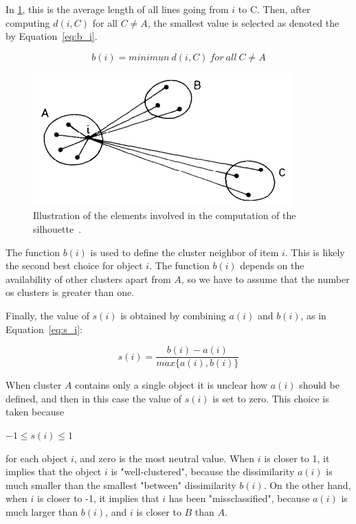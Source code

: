 \documentclass[journal]{IEEEtran}
\begin{document}
	In \ref{fig:silhouette}, this is the average length of all lines going from $i$ to C. Then, after computing $d(i, C)$ for all $C \neq A$, the smallest value is selected as denoted the by Equation~\ref{eq:b_i}.
	
	\begin{equation} \label{eq:b_i}
	b(i) = minimun~d(i, C)~for~all~C \neq A
	\end{equation}
	
	\begin{figure}[!htb]
		\centering
		\includegraphics[scale=.6]{figures/silhouette_img.png}
		\caption{Illustration of the elements involved in the computation of the silhouette~\cite{rousseeuw1987silhouettes}.}
		\label{fig:silhouette}
	\end{figure}
	
	The function $b(i)$ is used to define the cluster neighbor of item $i$. This is likely the second best choice for object $i$. The function $b(i)$ depends on the availability of other clusters apart from $A$, so we have to assume that the number os clusters is greater than one.
	
	Finally, the value of $s(i)$ is obtained by combining $a(i)$ and $b(i)$, as in  Equation~\ref{eq:s_i}:
	
	\begin{equation} \label{eq:s_i}
	s(i) = \frac{b(i) - a(i)}{max\{a(i), b(i)\}}
	\end{equation}
	
	When cluster $A$ contains only a single object it is unclear how $a(i)$ should be defined, and then in this case the value of $s(i)$ is set to zero. This choice is taken because
	\begin{center}
		$-1 \le s(i) \le 1$
	\end{center}
	
	for each object $i$, and zero is the most neutral value. When $i$ is closer to 1, it implies that the object $i$ is "well-clustered", because the dissimilarity $a(i)$ is much smaller than the smallest "between" dissimilarity $b(i)$. On the other hand, when $i$ is closer to -1, it implies that $i$ has been "missclassified", because $a(i)$ is much larger than $b(i)$, and $i$ is closer to $B$ than $A$.
	
\end{document}
